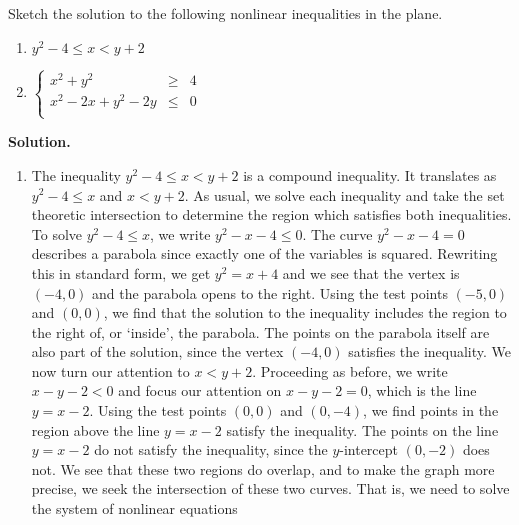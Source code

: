 \begin{ex}  \label{nonlinearex3} Sketch the solution to the following nonlinear inequalities in the plane.

\begin{multicols}{2}

\begin{enumerate}

\item $y^2 - 4 \leq x < y+2$

\item $\left\{\begin{array}{rcr}  x^2 +y^2 & \geq & 4 \\ x^2 - 2x + y^2 - 2y & \leq & 0 \\ \end{array} \right.$

\end{enumerate}

\end{multicols}

{\bf Solution.}  

\begin{enumerate}

\item  The inequality $y^2 - 4 \leq x < y+2$ is a compound inequality.  It translates as $y^2 - 4 \leq x$ and $x < y+2$.  As usual, we solve each inequality and take the set theoretic intersection to determine the region which satisfies both inequalities.  To solve $y^2 - 4 \leq x$, we write $y^2 - x - 4 \leq 0$.  The curve $y^2 - x - 4 = 0$ describes a parabola since exactly one of the variables is squared.  Rewriting this in standard form, we get $y^2 = x+4$ and we see that the vertex is $(-4,0)$ and the parabola opens to the right.  Using the test points $(-5,0)$ and $(0,0)$, we find that the solution to the inequality includes the region to the right of, or `inside', the parabola.  The points on the parabola itself are also part of the solution, since the vertex $(-4,0)$ satisfies the inequality. We now turn our attention to $x < y+2$.  Proceeding as before, we write $x - y - 2 < 0$ and focus our attention on $x-y-2 = 0$, which is the line $y = x-2$.  Using the test points $(0,0)$ and $(0,-4)$, we find points in the region above the line $y=x-2$ satisfy the inequality. The points on the line $y = x-2$ do not satisfy the inequality, since the $y$-intercept $(0,-2)$ does not.  We see that these two regions do overlap, and to make the graph more precise, we seek the intersection of these two curves.  That is, we need to solve the system of nonlinear equations


\end{enumerate}
\end{ex}
